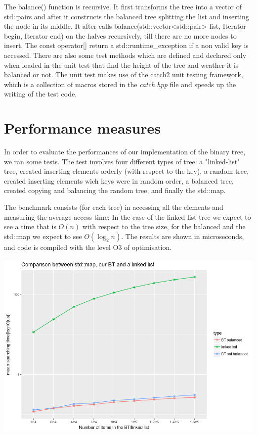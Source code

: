 \documentclass[a4paper,11pt]{article}
\begin{document}
The balance() function is recursive. It first transforms the tree into a vector of std::pairs and after it  constructs the balanced tree splitting the list and inserting the node in its middle. It after calls balance(std::vector<std::pair> list, Iterator begin, Iterator end) on the halves recursively, till there are no more nodes to insert.
The const operator[] return a std::runtime\_exception if a non valid key is accessed.
There are also some test methods which are defined and declared only when loaded in the unit test that find the height of the tree and weather it is balanced or not. 
The unit test makes use of the catch2 unit testing framework, which is a collection of macros stored in the \emph{catch.hpp} file and speeds up the writing of the test code. 

\section*{Performance measures}
In order to evaluate the performances of our implementation of the binary tree, we ran some tests.
The test involves four different types of tree: a "linked-list" tree, created inserting elements orderly (with respect to the key), a random tree, created inserting elements wich keys were in random order, a balanced tree, created copying and balancing the random tree, and finally the std::map.

The benchmark consists (for each tree) in accessing all the elements and measuring the average access time:
In the case of the linked-list-tree we expect to see a time that is $O(n)$ with respect to the tree size, for the balanced and the std::map we expect to see $O(\log_2 n)$. 
The results are shown in microseconds, and code is compiled with the level O3 of optimisation.\\

\includegraphics[height=10cm]{./LL_vs_BT.png}\\
\end{document}
